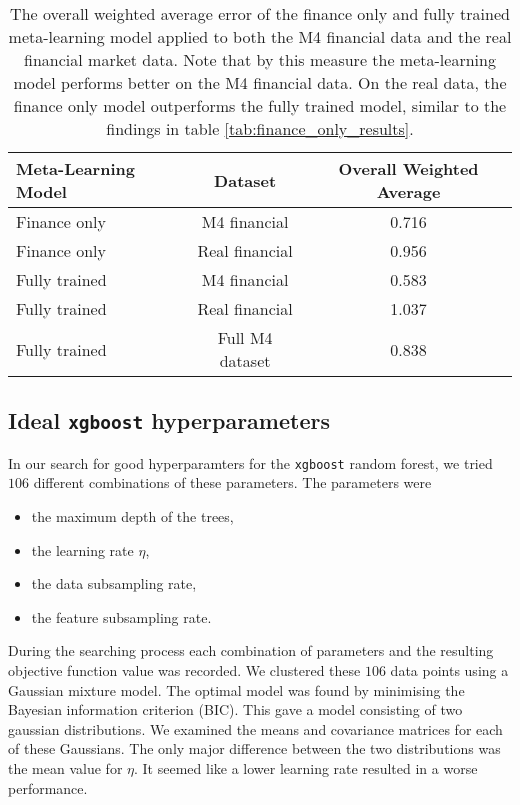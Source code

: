 \documentclass[a4paper,12pt]{article}
\theoremstyle{definition}
\begin{document}
\begin{table}
  \centering
  \begin{tabular}{| l | c | c |}
    \hline
    \textbf{Meta-Learning Model} & \textbf{Dataset} & \textbf{Overall Weighted Average} \\ \hline
    Finance only & M4 financial & 0.716 \\ \hline
    Finance only & Real financial & 0.956 \\ \hline
    Fully trained & M4 financial & 0.583 \\ \hline
    Fully trained & Real financial & 1.037 \\ \hline
    Fully trained & Full M4 dataset & 0.838\cite{res} \\ \hline
  \end{tabular}
  \caption{The overall weighted average error of the finance only and fully trained meta-learning model applied to both the M4 financial data and the real financial market data. Note that by this measure the meta-learning model performs better on the M4 financial data. On the real data, the finance only model outperforms the fully trained model, similar to the findings in table \ref{tab:finance_only_results}.}
  \label{tab:meta_learning_errors}
\end{table}

\subsection{Ideal \texttt{xgboost} hyperparameters}
In our search for good hyperparamters for the \texttt{xgboost} random forest, we tried $106$ different combinations of these parameters. The parameters were 
\begin{itemize}
	\item the maximum depth of the trees,
	\item the learning rate $\eta$,
	\item the data subsampling rate,
	\item the feature subsampling rate.
\end{itemize}
During the searching process each combination of parameters and the resulting objective function value was recorded. We clustered these $106$ data points using a Gaussian mixture model. The optimal model was found by minimising the Bayesian information criterion (BIC). This gave a model consisting of two gaussian distributions. We examined the means and covariance matrices for each of these Gaussians. The only major difference between the two distributions was the mean value for $\eta$. It seemed like a lower learning rate resulted in a worse performance.
\end{document}

